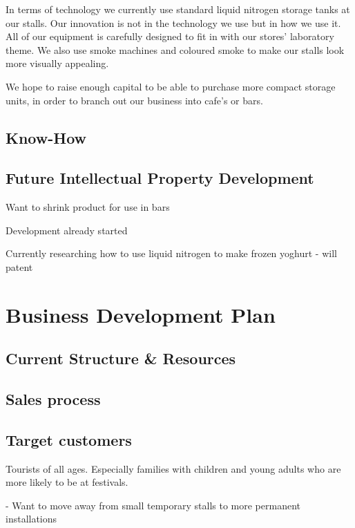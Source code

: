 \documentclass{article}
\begin{document}
  In terms of technology we currently use standard liquid nitrogen storage tanks at our stalls. Our innovation is not in the technology we use but in how we use it. All of our equipment is carefully designed to fit in with our stores' laboratory theme. We also use smoke machines and coloured smoke to make our stalls look more visually appealing.

  We hope to raise enough capital to be able to purchase more compact storage units, in order to branch out our business into cafe's or bars.

  \subsection{Know-How}

  \subsection{Future Intellectual Property Development}

  Want to shrink product for use in bars

  Development already started

  Currently researching how to use liquid nitrogen to make frozen yoghurt - will patent

\section{Business Development Plan}



  \subsection{Current Structure \& Resources}

  \subsection{Sales process}

  \subsection{Target customers}
Tourists of all ages. Especially families with children and young adults
who are more likely to be at festivals.

 - Want to move away from small temporary stalls to more permanent
installations
\end{document}
